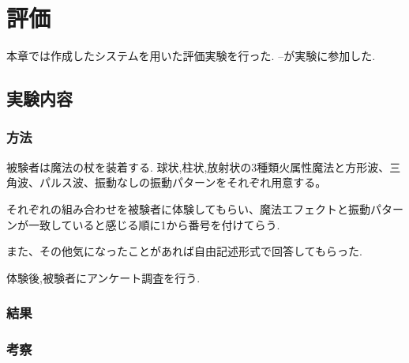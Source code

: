 \chapter{評価}
本章では作成したシステムを用いた評価実験を行った.
--が実験に参加した.

\section{実験内容}

\subsection{方法}
被験者は魔法の杖を装着する.
球状,柱状,放射状の3種類火属性魔法と方形波、三角波、パルス波、振動なしの振動パターンをそれぞれ用意する。

それぞれの組み合わせを被験者に体験してもらい、魔法エフェクトと振動パターンが一致していると感じる順に1から番号を付けてらう.



また、その他気になったことがあれば自由記述形式で回答してもらった.







体験後,被験者にアンケート調査を行う.

\subsection{結果}
\subsection{考察}
